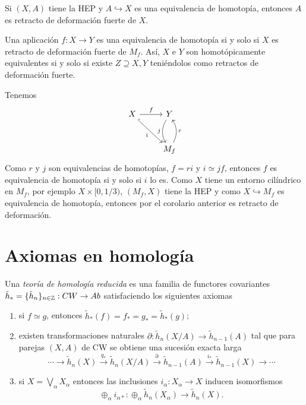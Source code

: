 \documentclass[TA.tex]{subfiles}
\begin{document}
\begin{coro}
Si $(X,A)$ tiene la HEP y $A\hookrightarrow X$ es una equivalencia de homotopía, entonces $A$ es retracto de deformación fuerte de $X$. 
\end{coro}
\begin{coro}
Una aplicación $f:X\to Y$ es una equivalencia de homotopía si y solo si $X$ es retracto de deformación fuerte de $M_f$. Así, $X$ e $Y$ son homotópicamente equivalentes si y solo si existe $Z\supseteq X,Y$ teniéndolos como retractos de deformación fuerte.
\end{coro}
\begin{dem}
Tenemos 
\[
\begin{tikzcd}[row sep=28]
X\arrow[r, "f"] \arrow[dr, hookrightarrow, "i"']& Y\arrow[d, bend right, "j"']\\
& M_f\arrow[u, bend right, "r"']
\end{tikzcd}
\]
Como $r$ y $j$ son equivalencias de homotopías, $f=ri$ y $i\simeq jf$, entonces $f$ es equivalencia de homotopía si y solo si $i$ lo es. Como $X$ tiene un entorno cilíndrico en $M_f$, por ejemplo $X\times[0,1/3)$, $(M_f,X)$ tiene la HEP y como $X\hookrightarrow M_f$ es equivalencia de homotopía, entonces por el corolario anterior es retracto de deformación. 
\end{dem}


\section{Axiomas en homología}
Una \emph{teoría de homología reducida} es una familia de functores covariantes $\tilde{h}_*=\{\tilde{h}_n\}_{n\in\mathbb{Z}}:CW\to Ab$ satisfaciendo los siguientes axiomas
\begin{enumerate}
\item si $f\simeq g$, entonces $\tilde{h}_*(f)=f_*=g_*=\tilde{h}_*(g)$;
\item existen transformaciones naturales $\partial:\tilde{h}_n(X/A)\to\tilde{h}_{n-1}(A)$ tal que para parejas $(X,A)$ de CW se obtiene una sucesión exacta larga
\[
\cdots\to \tilde{h}_n(X)\xrightarrow{q_*}\tilde{h}_n(X/A)\xrightarrow{\partial}\tilde{h}_{n-1}(A)\xrightarrow{i_*}\tilde{h}_{n-1}(X)\to\cdots
\]
\item si $X=\bigvee_\alpha X_\alpha$ entonces las inclusiones $i_\alpha:X_\alpha\to X$ inducen isomorfismos $$\oplus_\alpha i_{\alpha*}:\oplus_\alpha\tilde{h}_n(X_\alpha)\to \tilde{h}_n(X).$$

\end{enumerate}
\end{document}
